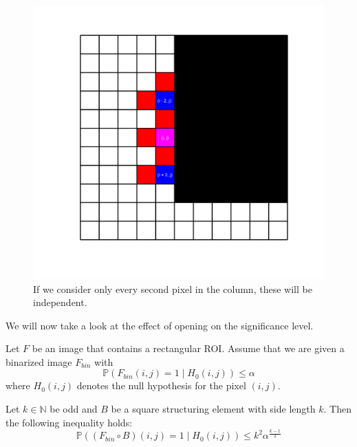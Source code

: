 \documentclass{beamer}
\begin{document}
\begin{frame}
	\begin{figure}[h]
		\includegraphics[width=0.6\linewidth]{Morphology/IndependentPoints}
		\caption[Independent points]{If we consider only every second pixel in the column, these will be independent.}
		\label{fig:IndependentPoints}
	\end{figure}
\end{frame}

\begin{frame}
	We will now take a look at the effect of opening on the significance level.
	
	\begin{theorem}
		Let $F$ be an image that contains a rectangular ROI. Assume that we are given a binarized image $F_{bin}$ with
		\begin{equation*}
			\mathbb{P}(F_{bin}(i, j) = 1 \mid H_0(i, j)) \leq \alpha
		\end{equation*}
		where $H_0(i, j)$ denotes the null hypothesis for the pixel $(i, j)$.
		
		Let $k \in \mathbb{N}$ be odd and $B$ be a square structuring element with side length $k$. Then the following inequality holds:
		\begin{equation*}
			\mathbb{P}((F_{bin} \circ B)(i, j) = 1 \mid H_0(i, j)) \leq k^2 \alpha^\frac{k - 1}{2}
		\end{equation*}
	\end{theorem}
\end{frame}
\end{document}
